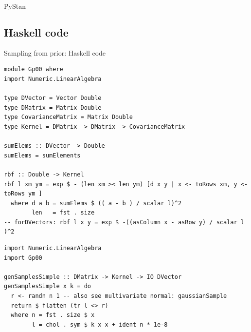 \documentclass[presentation]{beamer}
\begin{document}
\begin{frame}[label={sec:orgc65f091}]{PyStan}
\end{frame}

\subsection{Haskell code}
\label{sec:orgba9b81b}

\begin{frame}[fragile,label={sec:org600c7d3}]{Sampling from prior: Haskell code}
 \begin{verbatim}
module Gp00 where
import Numeric.LinearAlgebra

type DVector = Vector Double
type DMatrix = Matrix Double
type CovarianceMatrix = Matrix Double
type Kernel = DMatrix -> DMatrix -> CovarianceMatrix 

sumElems :: DVector -> Double
sumElems = sumElements 

rbf :: Double -> Kernel
rbf l xm ym = exp $ - (len xm >< len ym) [d x y | x <- toRows xm, y <- toRows ym ] 
  where d a b = sumElems $ (( a - b ) / scalar l)^2
        len   = fst . size
-- forDVectors: rbf l x y = exp $ -((asColumn x - asRow y) / scalar l )^2
\end{verbatim}
\begin{verbatim}
import Numeric.LinearAlgebra
import Gp00

genSamplesSimple :: DMatrix -> Kernel -> IO DVector
genSamplesSimple x k = do
  r <- randn n 1 -- also see multivariate normal: gaussianSample
  return $ flatten (tr l <> r)
  where n = fst . size $ x
        l = chol . sym $ k x x + ident n * 1e-8
\end{verbatim}
\end{frame}
\end{document}
